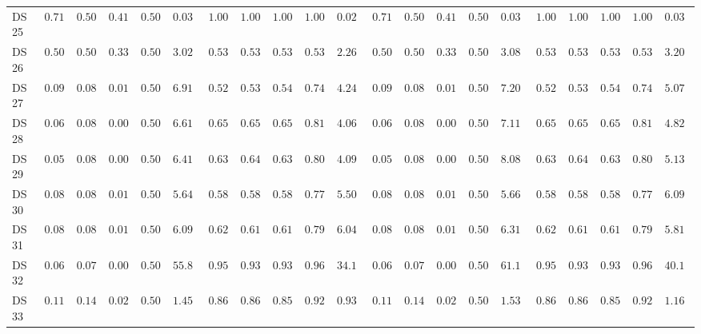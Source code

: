 {\begin{longtable}{|l|ccccc|ccccc|ccccc|ccccc|}
		DS 25 & $0.7143$ & $0.5000$ & $0.4167$ & $0.5000$ & $0.0365$ & $1.0000$ & $1.0000$ & $1.0000$ & $1.0000$ & $\boldsymbol{0.0209}$ & $0.7143$ & $0.5000$ & $0.4167$ & $0.5000$ & $0.0399$ & $\boldsymbol{1.0000}$ & $\boldsymbol{1.0000}$ & $\boldsymbol{1.0000}$ & $\boldsymbol{1.0000}$ & $0.0311$ \\
		DS 26 & $0.5040$ & $0.5000$ & $0.3351$ & $0.5000$ & $3.0268$ & $0.5360$ & $0.5360$ & $0.5360$ & $0.5360$ & $\boldsymbol{2.2643}$ & $0.5040$ & $0.5000$ & $0.3351$ & $0.5000$ & $3.0824$ & $0.5360$ & $0.5360$ & $0.5360$ & $0.5360$ & $3.2097$ \\
		DS 27 & $0.0923$ & $0.0833$ & $0.0141$ & $0.5000$ & $6.9185$ & $0.5282$ & $0.5333$ & $0.5430$ & $0.7454$ & $\boldsymbol{4.2418}$ & $0.0923$ & $0.0833$ & $0.0141$ & $0.5000$ & $7.2030$ & $0.5282$ & $0.5333$ & $0.5430$ & $0.7454$ & $5.0785$ \\
		DS 28 & $0.0615$ & $0.0833$ & $0.0097$ & $0.5000$ & $6.6140$ & $0.6564$ & $0.6553$ & $0.6503$ & $0.8120$ & $\boldsymbol{4.0631}$ & $0.0615$ & $0.0833$ & $0.0097$ & $0.5000$ & $7.1155$ & $0.6564$ & $0.6553$ & $0.6503$ & $0.8120$ & $4.8285$ \\
		DS 29 & $0.0564$ & $0.0833$ & $0.0089$ & $0.5000$ & $6.4176$ & $0.6308$ & $0.6416$ & $0.6399$ & $0.8045$ & $\boldsymbol{4.0949}$ & $0.0564$ & $0.0833$ & $0.0089$ & $0.5000$ & $8.0821$ & $0.6308$ & $0.6416$ & $0.6399$ & $0.8045$ & $5.1369$ \\
		DS 30 & $0.0884$ & $0.0833$ & $0.0135$ & $0.5000$ & $5.6428$ & $0.5856$ & $0.5836$ & $0.5820$ & $0.7729$ & $\boldsymbol{5.5045}$ & $0.0884$ & $0.0833$ & $0.0135$ & $0.5000$ & $5.6661$ & $0.5856$ & $0.5836$ & $0.5820$ & $0.7729$ & $6.0908$ \\
		DS 31 & $0.0884$ & $0.0833$ & $0.0135$ & $0.5000$ & $6.0904$ & $0.6243$ & $0.6179$ & $0.6179$ & $0.7916$ & $6.0428$ & $0.0884$ & $0.0833$ & $0.0135$ & $0.5000$ & $6.3116$ & $0.6243$ & $0.6179$ & $0.6179$ & $0.7916$ & $\boldsymbol{5.8175}$ \\
		DS 32 & $0.0693$ & $0.0714$ & $0.0093$ & $0.5000$ & $55.8167$ & $0.9503$ & $0.9357$ & $0.9360$ & $0.9654$ & $\boldsymbol{34.1195}$ & $0.0693$ & $0.0714$ & $0.0093$ & $0.5000$ & $61.1745$ & $0.9503$ & $0.9357$ & $0.9360$ & $0.9654$ & $40.1131$ \\
		DS 33 & $0.1136$ & $0.1429$ & $0.0292$ & $0.5000$ & $1.4556$ & $0.8636$ & $0.8646$ & $0.8568$ & $0.9210$ & $\boldsymbol{0.9370}$ & $0.1136$ & $0.1429$ & $0.0292$ & $0.5000$ & $1.5303$ & $0.8636$ & $0.8646$ & $0.8568$ & $0.9210$ & $1.1626$ \\

\end{longtable}}
